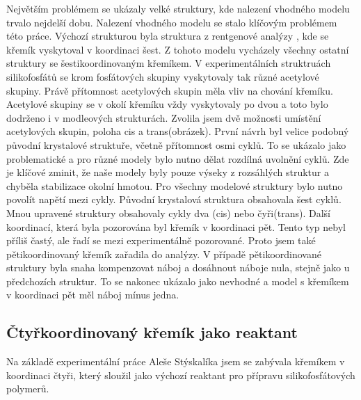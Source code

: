 \documentclass[
  digital, %
  table,   %
  lof,     %
  lot,     %
]{fithesis3}
\begin{document}
Největším problémem se ukázaly velké struktury, kde nalezení vhodného modelu trvalo nejdelší dobu. Nalezení vhodného modelu se stalo klíčovým problémem této práce.  Výchozí strukturou byla struktura z rentgenové analýzy \cite{C3NJ00721A}, kde se křemík vyskytoval v koordinaci šest. Z tohoto modelu vycházely všechny ostatní struktury se šestikoordinovaným křemíkem. V experimentálních struktruách silikofosfátů se krom fosfátových skupiny vyskytovaly tak různé acetylové skupiny. Právě přítomnost acetylových skupin měla vliv na chování křemíku. Acetylové skupiny  se v okolí křemíku vždy vyskytovaly po dvou a toto bylo dodrženo i v modleových strukturách. Zvolila jsem dvě možnosti umístění acetylových skupin, poloha cis a trans(obrázek). První návrh byl velice podobný původní krystalové struktuře, včetně přítomnost osmi cyklů. To se ukázalo jako problematické a pro různé modely bylo nutno dělat rozdílná uvolnění cyklů. Zde je klíčové zminit, že naše modely byly pouze výseky z rozsáhlých struktur a chyběla stabilizace okolní hmotou. Pro všechny modelové struktury bylo nutno povolít napětí mezi cykly. Původní krystalová struktura obsahovala šest cyklů. Mnou upravené struktury obsahovaly cykly dva (cis) nebo čyři(trans). Další koordinací, která byla pozorována byl křemík v koordinaci pět. Tento typ nebyl příliš častý, ale řadí se mezi experimentálně pozorované. Proto jsem také pětikoordinovaný křemík zařadila do analýzy. V případě pětikoordinované struktury byla snaha kompenzovat náboj a dosáhnout náboje nula, stejně jako u předchozích struktur. To se nakonec ukázalo jako nevhodné a model s křemíkem v koordinaci pět měl náboj mínus jedna.

\subsection{Čtyřkoordinovaný křemík jako reaktant}
Na základě experimentální práce Aleše Stýskalíka jsem se zabývala křemíkem v koordinaci čtyři, který sloužil jako výchozí reaktant pro přípravu silikofosfátových polymerů.
\end{document}
